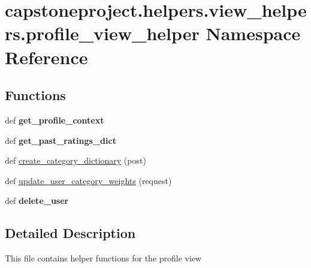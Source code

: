 \hypertarget{namespacecapstoneproject_1_1helpers_1_1view__helpers_1_1profile__view__helper}{}\section{capstoneproject.\+helpers.\+view\+\_\+helpers.\+profile\+\_\+view\+\_\+helper Namespace Reference}
\label{namespacecapstoneproject_1_1helpers_1_1view__helpers_1_1profile__view__helper}
\subsection*{Functions}
\begin{DoxyCompactItemize}
\item 
\mbox{\label{namespacecapstoneproject_1_1helpers_1_1view__helpers_1_1profile__view__helper_ac8e82ad5bd5540c4bad58cc277200a7f}} 
def {\bfseries get\+\_\+profile\+\_\+context}
\item 
\mbox{\label{namespacecapstoneproject_1_1helpers_1_1view__helpers_1_1profile__view__helper_ae916831ca5fb1354396c987d392edf67}} 
def {\bfseries get\+\_\+past\+\_\+ratings\+\_\+dict}
\item 
def \mbox{\hyperlink{namespacecapstoneproject_1_1helpers_1_1view__helpers_1_1profile__view__helper_a3abb91199b4a640e7e8b022e5a932bbe}{create\+\_\+category\+\_\+dictionary}} (post)
\item 
def \mbox{\hyperlink{namespacecapstoneproject_1_1helpers_1_1view__helpers_1_1profile__view__helper_a525487a0bcbba6157d364edc5cab00f7}{update\+\_\+user\+\_\+category\+\_\+weights}} (request)
\item 
\mbox{\label{namespacecapstoneproject_1_1helpers_1_1view__helpers_1_1profile__view__helper_a6003d8d07de17b1e9d63c4a6318f9d82}} 
def {\bfseries delete\+\_\+user}
\end{DoxyCompactItemize}


\subsection{Detailed Description}
\begin{DoxyVerb}This file contains helper functions for the profile view
\end{DoxyVerb}
 

